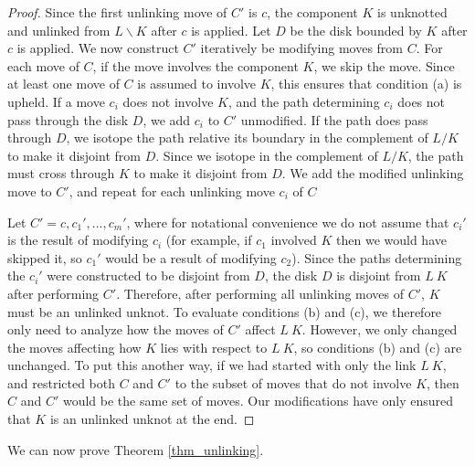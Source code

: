 \documentclass[12pt]{amsart}
\theoremstyle{definition}
\theoremstyle{remark}
\begin{document}
\begin{proof}
Since the first unlinking move of $C'$ is $c$, the component $K$ is unknotted and unlinked from $L\backslash K$ after $c$ is applied.
Let $D$ be the disk bounded by $K$ after $c$ is applied.
We now construct $C'$ iteratively be modifying moves from $C$.
For each move of $C$, if the move involves the component $K$, we skip the move.
Since at least one move of $C$ is assumed to involve $K$, this ensures that condition (a) is upheld.
If a move $c_i$ does not involve $K$, and the path determining $c_i$ does not pass through the disk $D$, we add $c_i$ to $C'$ unmodified.
If the path does pass through $D$, we isotope the path relative its boundary in the complement of $L/K$ to make it disjoint from $D$.
Since we isotope in the complement of $L/K$, the path must cross through $K$ to make it disjoint from $D$.
We add the modified unlinking move to $C'$, and repeat for each unlinking move $c_i$ of $C$

Let $C' = c, c_1', ..., c_m'$, where for notational convenience we do not assume that $c_i'$ is the result of modifying $c_i$ (for example, if $c_1$ involved $K$ then we would have skipped it, so $c_1'$ would be a result of modifying $c_2$).
Since the paths determining the $c_i'$ were constructed to be disjoint from $D$, the disk $D$ is disjoint from $L \ K$ after performing $C'$.
Therefore, after performing all unlinking moves of $C'$, $K$ must be an unlinked unknot.
To evaluate conditions (b) and (c), we therefore only need to analyze how the moves of $C'$ affect $L \ K$.
However, we only changed the moves affecting how $K$ lies with respect to $L \ K$, so conditions (b) and (c) are unchanged.
To put this another way, if we had started with only the link $L \ K$, and restricted both $C$ and $C'$ to the subset of moves that do not involve $K$, then $C$ and $C'$ would be the same set of moves.
Our modifications have only ensured that $K$ is an unlinked unknot at the end.
\end{proof}

We can now prove Theorem \ref{thm_unlinking}.
\end{document}
